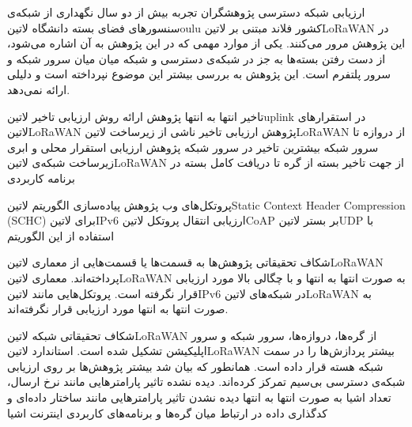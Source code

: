 \documentclass[dvipsnames]{beamer}
\begin{document}
\begin{persian}
	\begin{frame}{ارزیابی شبکه دسترسی}
	   پژوهشگران  تجربه بیش از دو سال نگهداری از شبکه‌ی سنسورهای فضای بسته دانشگاه ‌لاتین{oulu} کشور فلاند مبتنی بر ‌لاتین{LoRaWAN} در این پژوهش مرور می‌کنند.
	   یکی از موارد مهمی که در این پژوهش به آن اشاره می‌شود، از دست رفتن بسته‌ها به جز در شبکه‌ی دسترسی و
	  شبکه میان میان سرور شبکه و سرور پلتفرم است.
	   این پژوهش به بررسی بیشتر این موضوع نپرداخته است و دلیلی ارائه نمی‌دهد.
	\end{frame}

	\begin{frame}{تاخیر انتها به انتها}
	   پژوهش 
	   ارائه روش ارزیابی تاخیر ‌لاتین{uplink} در استقرارهای ‌لاتین{LoRaWAN}
	   پژوهش 
	   ارزیابی تاخیر ناشی از زیرساخت ‌لاتین{LoRaWAN} از دروازه تا سرور شبکه
	   بیشترین تاخیر در سرور شبکه
	   پژوهش 
	   ارزیابی استقرار محلی و ابری زیرساخت شبکه‌ی ‌لاتین{LoRaWAN} از جهت تاخیر بسته از گره تا دریافت کامل بسته در برنامه کاربردی
	\end{frame}

	\begin{frame}{پروتکل‌های وب}
	   پژوهش 
	   پیاده‌سازی الگوریتم ‌لاتین{Static Context Header Compression (SCHC)} برای ‌لاتین{IPv6}
	   ارزیابی انتقال پروتکل ‌لاتین{CoAP} بر بستر ‌لاتین{UDP} با استفاده از این الگوریتم
	\end{frame}

	\begin{frame}{شکاف تحقیقاتی}
	   پژوهش‌ها به قسمت‌ها یا قسمت‌هایی از معماری ‌لاتین{LoRaWAN} پرداخته‌اند.
	   معماری ‌لاتین{LoRaWAN} به صورت انتها به انتها و با چگالی بالا مورد ارزیابی قرار نگرفته است.
	   پروتکل‌هایی مانند ‌لاتین{IPv6} در شبکه‌های ‌لاتین{LoRaWAN} به صورت انتها به انتها مورد ارزیابی قرار نگرفته‌اند.
	\end{frame}

	\begin{frame}{شکاف تحقیقاتی}
		 شبکه ‌لاتین{LoRaWAN} از گره‌ها، دروازه‌ها، سرور شبکه و سرور اپلیکیشن تشکیل شده است.
		 استاندارد ‌لاتین{LoRaWAN} بیشتر پردازش‌ها را در سمت شبکه هسته قرار داده است.
		 همانطور که بیان شد بیشتر پژوهش‌ها بر روی ارزیابی شبکه‌ی دسترسی بی‌سیم تمرکز کرده‌اند.
		 دیده نشده تاثیر پارامترهایی مانند نرخ ارسال، تعداد اشیا به صورت انتها به انتها
		 دیده نشدن تاثیر پارامترهایی مانند ساختار داده‌ای و کدگذاری داده در ارتباط میان گره‌ها و برنامه‌های کاربردی اینترنت اشیا
	\end{frame}


\end{persian}
\end{document}

